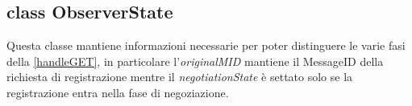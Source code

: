 		\subsection { class ObserverState }
			Questa classe mantiene informazioni necessarie per poter distinguere le varie fasi della \ref{handleGET}, in particolare l'\textit{originalMID} mantiene il MessageID della richiesta di registrazione mentre il \textit{negotiationState} è settato solo se la registrazione entra nella fase di negoziazione.
			
